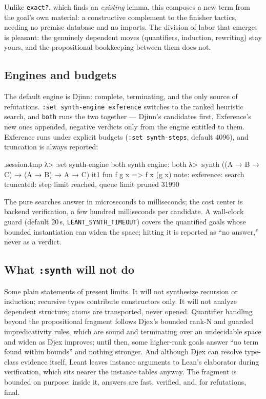 \documentclass[11pt,oneside]{article}
\newcommand{\code}[1]{\texttt{#1}}
\newenvironment{session}
 {\VerbatimEnvironment\begin{VerbatimOut}{\jobname.session.tmp}}
 {\end{VerbatimOut}%
  \begin{sessionouter}%
  \VerbatimInput[fontsize=\footnotesize, breaklines=true,
    breaksymbolleft={\textcolor{stone}{\footnotesize$\hookrightarrow$}},
    formatcom=\color{ink}, tabsize=4]{\jobname.session.tmp}%
  \end{sessionouter}}
\begin{document}
Unlike \code{exact?}, which finds an \emph{existing} lemma, this
composes a new term from the goal's own material: a constructive
complement to the finisher tactics, needing no premise database and
no imports. The division of labor that
emerges is pleasant: the genuinely dependent moves (quantifiers,
induction, rewriting) stay yours, and the propositional bookkeeping
between them does not.

\subsection{Engines and budgets}\label{sec:engines}

The default engine is Djinn: complete, terminating, and the only
source of refutations. \code{:set synth-engine exference} switches to
the ranked heuristic search, and \code{both} runs the two together ---
Djinn's candidates first, Exference's new ones appended, negative
verdicts only from the engine entitled to them. Exference runs under
explicit budgets (\code{:set synth-steps}, default 4096), and
truncation is always reported:

\begin{session}
λ> :set synth-engine both
synth engine: both
λ> :synth ((A → B → C) → (A → B) → A → C)
  it1  fun f g x => f x (g x)
note: exference: search truncated: step limit reached, queue limit pruned 31990
\end{session}

The pure searches answer in microseconds to milliseconds; the cost
center is backend verification, a few hundred milliseconds per
candidate. A wall-clock guard (default 20\,s,
\code{LEANT\_SYNTH\_TIMEOUT}) covers the quantified goals whose
bounded instantiation can widen the space; hitting it is reported as
``no answer,'' never as a verdict.

\subsection{What \code{:synth} will not do}\label{sec:limits}

Some plain statements of present limits. It will not synthesize
recursion or induction; recursive types contribute constructors only.
It will not analyze dependent structure; atoms are transported, never
opened. Quantifier handling beyond the propositional fragment follows
Djex's bounded rank-N and guarded impredicativity rules, which are
sound and terminating over an undecidable space and widen as Djex
improves; until then, some higher-rank goals answer ``no term found
within bounds'' and nothing stronger. And although Djex can resolve
type-class evidence itself, Leant leaves instance arguments to Lean's
elaborator during verification, which sits nearer the instance tables
anyway. The fragment is bounded on purpose: inside it, answers are
fast, verified, and, for refutations, final.
\end{document}
